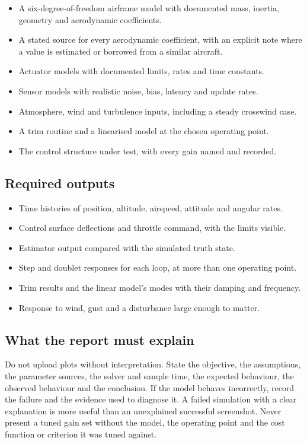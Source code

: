 \documentclass[11pt,a4paper]{article}
\begin{document}
\begin{itemize}
  \item A six-degree-of-freedom airframe model with documented mass, inertia, geometry and aerodynamic coefficients.
  \item A stated source for every aerodynamic coefficient, with an explicit note where a value is estimated or borrowed from a similar aircraft.
  \item Actuator models with documented limits, rates and time constants.
  \item Sensor models with realistic noise, bias, latency and update rates.
  \item Atmosphere, wind and turbulence inputs, including a steady crosswind case.
  \item A trim routine and a linearised model at the chosen operating point.
  \item The control structure under test, with every gain named and recorded.
\end{itemize}

\subsection{Required outputs}

\begin{itemize}
  \item Time histories of position, altitude, airspeed, attitude and angular rates.
  \item Control surface deflections and throttle command, with the limits visible.
  \item Estimator output compared with the simulated truth state.
  \item Step and doublet responses for each loop, at more than one operating point.
  \item Trim results and the linear model's modes with their damping and frequency.
  \item Response to wind, gust and a disturbance large enough to matter.
\end{itemize}

\subsection{What the report must explain}

Do not upload plots without interpretation. State the objective, the
assumptions, the parameter sources, the solver and sample time, the expected
behaviour, the observed behaviour and the conclusion. If the model behaves
incorrectly, record the failure and the evidence used to diagnose it. A failed
simulation with a clear explanation is more useful than an unexplained
successful screenshot. Never present a tuned gain set without the model, the
operating point and the cost function or criterion it was tuned against.
\end{document}
